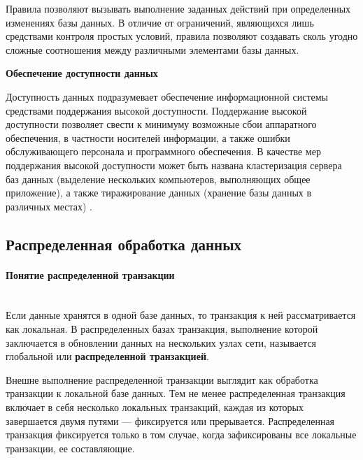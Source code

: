 Правила позволяют вызывать выполнение заданных действий при определенных изменениях базы данных.
В отличие от ограничений, являющихся лишь средствами контроля простых условий, правила позволяют
создавать сколь угодно сложные соотношения между различными элементами базы данных.

\bigbreak
\textbf{Обеспечение доступности данных}

Доступность данных подразумевает обеспечение информационной системы средствами поддержания высокой
доступности. Поддержание высокой доступности позволяет свести к минимуму возможные сбои аппаратного
обеспечения, в частности носителей информации, а также ошибки обслуживающего персонала и программного
обеспечения. В качестве мер поддержания высокой доступности может быть названа кластеризация сервера баз
данных (выделение нескольких компьютеров, выполняющих общее приложение), а также тиражирование данных
(хранение базы данных в различных местах) \autocite{DistrDBThreats}.




\subsection{Распределенная обработка данных}
\paragraph{Понятие распределенной транзакции}~\\
Если данные хранятся в одной базе данных, то транзакция к ней рассматривается как локальная.
В распределенных базах транзакция, выполнение которой заключается в обновлении данных на нескольких узлах сети,
называется глобальной или \textbf{распределенной транзакцией}.

Внешне выполнение распределенной транзакции выглядит как обработка транзакции к локальной базе данных.
Тем не менее распределенная транзакция включает в себя несколько локальных транзакций, каждая из которых
завершается двумя путями — фиксируется или прерывается. Распределенная транзакция фиксируется только в том случае,
когда зафиксированы все локальные транзакции, ее составляющие.

